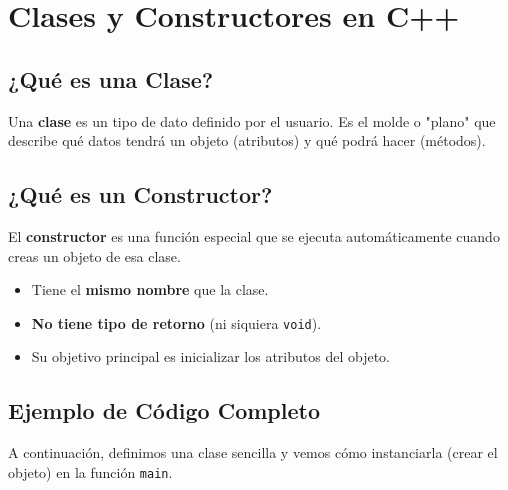 \documentclass{article}
\begin{document}
\section{Clases y Constructores en C++}

    \subsection*{¿Qué es una Clase?}

        Una \textbf{clase} es un tipo de dato definido por el usuario. Es
        el molde o "plano" que describe qué datos tendrá un objeto
        (atributos) y qué podrá hacer (métodos).

    \subsection*{¿Qué es un Constructor?}

        El \textbf{constructor} es una función especial que se ejecuta
        automáticamente cuando creas un objeto de esa clase.

        \begin{itemize}
            \item Tiene el \textbf{mismo nombre} que la clase.
            \item \textbf{No tiene tipo de retorno} (ni siquiera \texttt{void}).
            \item Su objetivo principal es inicializar los atributos del objeto.
        \end{itemize}

    \subsection*{Ejemplo de Código Completo}

        A continuación, definimos una clase sencilla y vemos cómo
        instanciarla (crear el objeto) en la función \texttt{main}.
\end{document}
